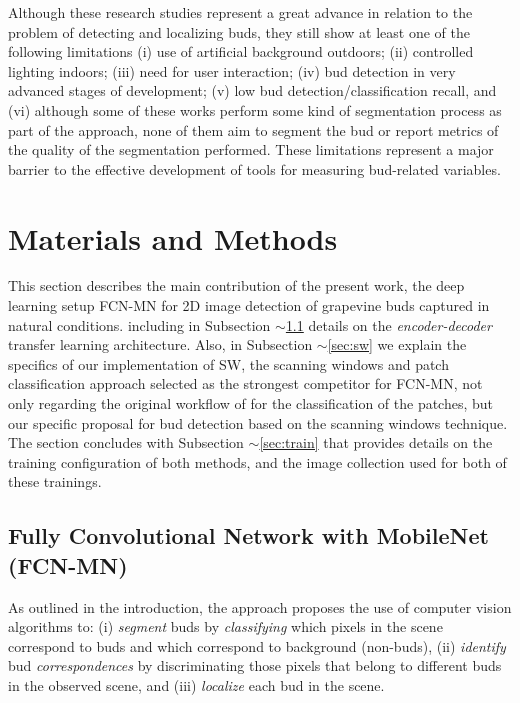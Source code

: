 \documentclass[a4paper,authoryear,review]{elsarticle}
\begin{document}
	Although these research studies represent a great advance in relation to the problem of detecting and localizing buds, they still show at least one of the following limitations (i) use of artificial background outdoors; (ii) controlled lighting indoors; (iii) need for user interaction; (iv) bud detection in very advanced stages of development; (v) low bud detection/classification recall, and (vi) although some of these works perform some kind of segmentation process as part of the approach, none of them aim to segment the bud or report metrics of the quality of the segmentation performed. These limitations represent a major barrier to the effective development of tools for measuring bud-related variables. 
	
	\section{Materials and Methods}
	\label{sec:matmet}
	
	This section describes the main contribution of the present work, the deep learning setup FCN-MN for 2D image detection of grapevine buds captured in natural conditions. including in Subsection $\sim$\ref{sec:fcn} details on the \emph{encoder-decoder} transfer learning architecture. 
	Also, in Subsection $\sim$\ref{sec:sw} we explain the specifics of our implementation of SW, the scanning windows and patch classification approach selected as the strongest competitor for FCN-MN, not only regarding the original workflow of \citet{perez2017image} for the classification of the patches, but our specific proposal for bud detection based on the scanning windows technique.
	The section concludes with Subsection $\sim$\ref{sec:train} that provides details on the training configuration of both methods, and the image collection used for both of these trainings.
	
	\subsection{Fully Convolutional Network with MobileNet (FCN-MN)}
	\label{sec:fcn}
	
	As outlined in the introduction, the approach proposes the use of computer vision algorithms to: (i) \emph{segment} buds by \emph{classifying} which pixels in the scene correspond to buds and which correspond to background (non-buds), (ii) \emph{identify} bud \emph{correspondences} by discriminating those pixels that belong to different buds in the observed scene, and (iii) \emph{localize} each bud in the scene. 
	
\end{document}
